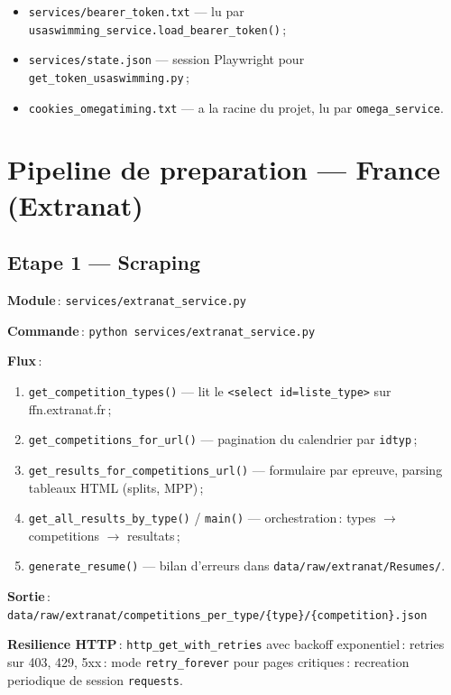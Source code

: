 \documentclass[11pt,a4paper]{article}
\begin{document}
\begin{itemize}
  \item \texttt{services/bearer\_token.txt} --- lu par \texttt{usaswimming\_service.load\_bearer\_token()}\,;
  \item \texttt{services/state.json} --- session Playwright pour \texttt{get\_token\_usaswimming.py}\,;
  \item \texttt{cookies\_omegatiming.txt} --- a la racine du projet, lu par \texttt{omega\_service}.
\end{itemize}

\section{Pipeline de preparation --- France (Extranat)}

\subsection{Etape 1 --- Scraping}

\textbf{Module}\,: \texttt{services/extranat\_service.py}

\textbf{Commande}\,: \texttt{python services/extranat\_service.py}

\textbf{Flux}\,:
\begin{enumerate}
  \item \texttt{get\_competition\_types()} --- lit le \texttt{<select id=liste\_type>} sur ffn.extranat.fr\,;
  \item \texttt{get\_competitions\_for\_url()} --- pagination du calendrier par \texttt{idtyp}\,;
  \item \texttt{get\_results\_for\_competitions\_url()} --- formulaire par epreuve, parsing tableaux HTML (splits, MPP)\,;
  \item \texttt{get\_all\_results\_by\_type()} / \texttt{main()} --- orchestration\,: types $\rightarrow$ competitions $\rightarrow$ resultats\,;
  \item \texttt{generate\_resume()} --- bilan d'erreurs dans \texttt{data/raw/extranat/Resumes/}.
\end{enumerate}

\textbf{Sortie}\,: \texttt{data/raw/extranat/competitions\_per\_type/\{type\}/\{competition\}.json}

\textbf{Resilience HTTP}\,: \texttt{http\_get\_with\_retries} avec backoff exponentiel\,: retries sur 403, 429, 5xx\,: mode \texttt{retry\_forever} pour pages critiques\,: recreation periodique de session \texttt{requests}.
\end{document}
